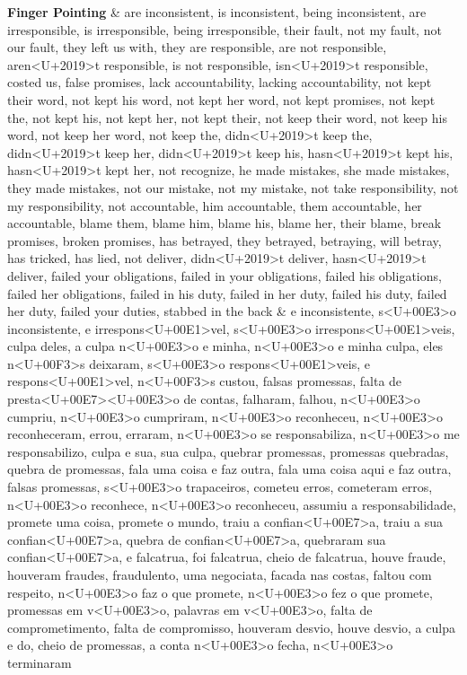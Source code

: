 \documentclass[
  12pt,
]{article}
\begin{document}
\begin{landscape}
\begin{longtabu}
\textbf{Finger Pointing} & are inconsistent, is inconsistent, being inconsistent, are irresponsible, is irresponsible, being irresponsible, their fault, not my fault, not our fault, they left us with, they are responsible, are not responsible, aren<U+2019>t responsible, is not responsible, isn<U+2019>t responsible, costed us, false promises, lack accountability, lacking accountability, not kept their word, not kept his word, not kept her word, not kept promises, not kept the, not kept his, not kept her, not kept their, not keep their word, not keep his word, not keep her word, not keep the, didn<U+2019>t keep the, didn<U+2019>t keep her, didn<U+2019>t keep his, hasn<U+2019>t kept his, hasn<U+2019>t kept her, not recognize, he made mistakes, she made mistakes, they made mistakes, not our mistake, not my mistake, not take responsibility, not my responsibility, not accountable, him accountable, them accountable, her accountable, blame them, blame him, blame his, blame her, their blame, break promises, broken promises, has betrayed, they betrayed, betraying, will betray, has tricked, has lied, not deliver, didn<U+2019>t deliver, hasn<U+2019>t deliver, failed your obligations, failed in your obligations, failed his obligations, failed her obligations, failed in his duty, failed in her duty, failed his duty, failed her duty, failed your duties, stabbed in the back & e inconsistente, s<U+00E3>o inconsistente, e irrespons<U+00E1>vel, s<U+00E3>o irrespons<U+00E1>veis, culpa deles, a culpa n<U+00E3>o e minha, n<U+00E3>o e minha culpa, eles n<U+00F3>s deixaram, s<U+00E3>o respons<U+00E1>veis, e respons<U+00E1>vel, n<U+00F3>s custou, falsas promessas, falta de presta<U+00E7><U+00E3>o de contas, falharam, falhou, n<U+00E3>o cumpriu, n<U+00E3>o cumpriram, n<U+00E3>o reconheceu, n<U+00E3>o reconheceram, errou, erraram, n<U+00E3>o se responsabiliza, n<U+00E3>o me responsabilizo, culpa e sua, sua culpa, quebrar promessas, promessas quebradas, quebra de promessas, fala uma coisa e faz outra, fala uma coisa aqui e faz outra, falsas promessas, s<U+00E3>o trapaceiros, cometeu erros, cometeram erros, n<U+00E3>o reconhece, n<U+00E3>o reconheceu, assumiu a responsabilidade, promete uma coisa, promete o mundo, traiu a confian<U+00E7>a, traiu a sua confian<U+00E7>a, quebra de confian<U+00E7>a, quebraram sua confian<U+00E7>a, e falcatrua, foi falcatrua, cheio de falcatrua, houve fraude, houveram fraudes, fraudulento, uma negociata, facada nas costas, faltou com respeito, n<U+00E3>o faz o que promete, n<U+00E3>o fez o que promete, promessas em v<U+00E3>o, palavras em v<U+00E3>o, falta de comprometimento, falta de compromisso, houveram desvio, houve desvio, a culpa e do, cheio de promessas, a conta n<U+00E3>o fecha, n<U+00E3>o terminaram\\

\end{longtabu}
\end{landscape}
\end{document}
